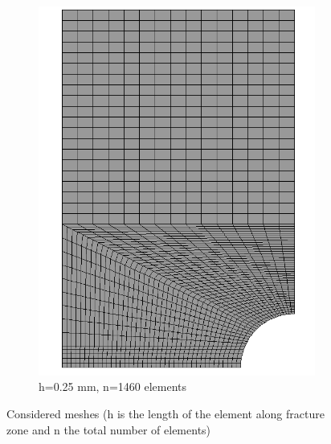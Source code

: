 \documentclass[12pt]{report}
\begin{document}
\begin{figure}[htbp!]
\begin{subfigure}{0.27\textwidth}
         \includegraphics[width=1.27\textwidth]{25.0.25mm2.png}
         \caption{h=0.25 mm, n=1460 elements}
         \label{fig:0.25mm}
     \end{subfigure}
    \caption{Considered meshes (h is the length of the element along fracture zone and n the total number of elements) }
    \label{fig:Considered meshes}
\end{figure}
\FloatBarrier
\end{document}
